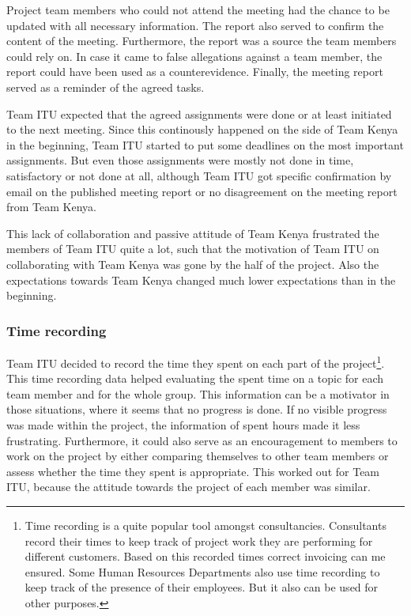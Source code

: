 Project team members who could not attend the meeting had the chance to be updated with all necessary information. The report also served to confirm the content of the meeting. Furthermore, the report was a source the team members could rely on. In case it came to false allegations against a team member, the report could have been used as a counterevidence. Finally, the meeting report served as a reminder of the agreed tasks.

Team ITU expected that the agreed assignments were done or at least initiated to the next meeting. Since this continously happened on the side of Team Kenya in the beginning, Team ITU started to put some deadlines on the most important assignments. But even those assignments were mostly not done in time, satisfactory or not done at all, although Team ITU got specific confirmation by email on the published meeting report or no disagreement on the meeting report from Team Kenya.

This lack of collaboration and passive attitude of Team Kenya frustrated the members of Team ITU quite a lot, such that the motivation of Team ITU on collaborating with Team Kenya was gone by the half of the project. Also the expectations towards Team Kenya changed much lower expectations than in the beginning.


\subsubsection {Time recording}
\label{sec:time_recording}
Team ITU decided to record the time they spent on each part of the project\footnote{Time recording is a quite popular tool amongst consultancies. Consultants record their times to keep track of project work they are performing for different customers. Based on this recorded times correct invoicing can me ensured. Some Human Resources Departments also use time recording to keep track of the presence of their employees. But it also can be used for other purposes.}. This time recording data helped evaluating the spent time on a topic for each team member and for the whole group. This information can be a motivator in those situations, where it seems that no progress is done. If no visible progress was made within the project, the information of spent hours made it less frustrating. Furthermore, it could also serve as an encouragement to members to work on the project by either comparing themselves to other team members or assess whether the time they spent is appropriate. This worked out for Team ITU, because the attitude towards the project of each member was similar.

